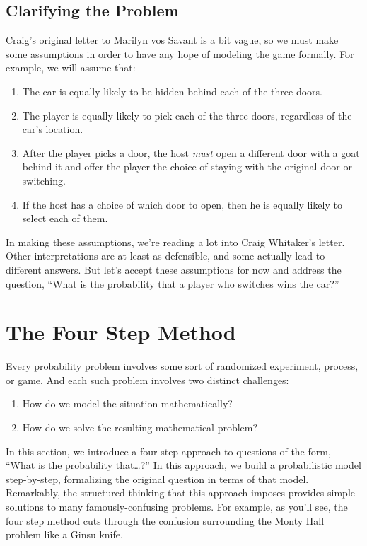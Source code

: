 \subsection{Clarifying the Problem}

Craig's original letter to Marilyn vos Savant is a bit vague, so we
must make some assumptions in order to have any hope of modeling the
game formally.  For example, we will assume that:
\begin{enumerate}

\item The car is equally likely to be hidden behind each of the three
doors.

\item The player is equally likely to pick each of the three doors,
regardless of the car's location.

\item After the player picks a door, the host \emph{must} open a
different door with a goat behind it and offer the player the choice
of staying with the original door or switching.

\item If the host has a choice of which door to open, then he is
equally likely to select each of them.

\end{enumerate}
%
In making these assumptions, we're reading a lot into Craig Whitaker's
letter.  Other interpretations are at least as defensible, and some
actually lead to different answers.  But let's accept these
assumptions for now and address the question, ``What is the
probability that a player who switches wins the car?''

\section{The Four Step Method}

Every probability problem involves some sort of randomized experiment,
process, or game.  And each such problem involves two distinct
challenges:
%
\begin{enumerate}
\item How do we model the situation mathematically?
\item How do we solve the resulting mathematical problem?
\end{enumerate}
%
In this section, we introduce a four step approach to questions of the
form, ``What is the probability that\dots?''  In this approach, we build
a probabilistic model step-by-step, formalizing the original question in
terms of that model.  Remarkably, the structured thinking that this
approach imposes provides simple solutions to many famously-confusing
problems.  For example, as you'll see, the four step method cuts through
the confusion surrounding the Monty Hall problem like a Ginsu knife.

